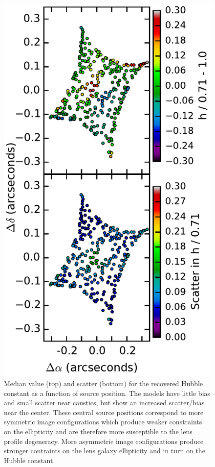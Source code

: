 \documentclass{emulateapj}
\begin{document}
\begin{figure}
\begin{center}
\includegraphics[width=1\columnwidth]{h_src_pos.pdf}
\caption{\label{fig:srcpos}
Median value (top) and scatter (bottom) for the recovered Hubble constant as a function of source position. The models have little bias and small scatter near caustics, but show an increased scatter/bias near the center. These central source positions correspond to more symmetric image configurations which produce weaker constraints on the ellipticity and are therefore more susceptible to the lens profile degeneracy. More asymmetric image configurations produce stronger contraints on the lens galaxy ellipticity and in turn on the Hubble constant.
}
\end{center}
\end{figure}
\end{document}
